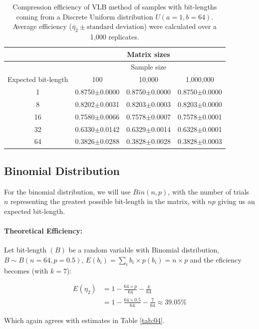 \documentclass[10pt]{article}
\begin{document}
\begin{table}[h]
  \centering
  \caption{Compression efficiency of VLB method of samples with bit-lengths coming from a Discrete Uniform distribution $U(a=1,b=64)$. Average efficiency ($\overline{\eta_2}\pm\textrm{standard deviation}$) were calculated over a 1,000 replicates.}
 \begin{tabular}{cccc}
    \hline
    & &Matrix sizes& \\
    \hline
    & &Sample size & \\
    Expected bit-length & 100 & 10,000 & 1,000,000 \\
    \hline
     1&0.8750$\pm$0.0000& 0.8750$\pm$0.0000&0.8750$\pm$0.0000\\ 
     8&0.8202$\pm$0.0031& 0.8203$\pm$0.0003&0.8203$\pm$0.0000\\ 
     16&0.7580$\pm$0.0066& 0.7578$\pm$0.0007&0.7578$\pm$0.0001\\ 
     32&0.6330$\pm$0.0142& 0.6329$\pm$0.0014&0.6328$\pm$0.0001\\ 
     64&0.3826$\pm$0.0288& 0.3828$\pm$0.0028&0.3828$\pm$0.0003\\ 
    \hline
 \end{tabular}
 \label{tab:03}
\end{table}

\subsection*{Binomial Distribution}

For the binomial distribution, we will use $Bin(n, p)$, with the number of trials $n$ representing the greatest possible bit-length in the matrix, with $np$ giving us an expected bit-length.

\paragraph{Theoretical Efficiency:}
Let bit-length $(B)$ be a random variable with Binomial distribution, $B \sim B(n=64,p=0.5)$, $E(b_i) = \sum_{i} b_i \times p(b_i) = n \times p$ and the eficiency becomes (with $k=7$):

\begin{align}\label{eq:47}
 E(\eta_2) &= 1 - \frac{64 \times p }{64} - \frac{k}{64}  \\
  &= 1 - \frac{64 \times 0.5 }{64} - \frac{7}{64} \approx 39.05\% \nonumber
\end{align}

Which again agrees with estimates in Table \ref{tab:04}.
\end{document}
